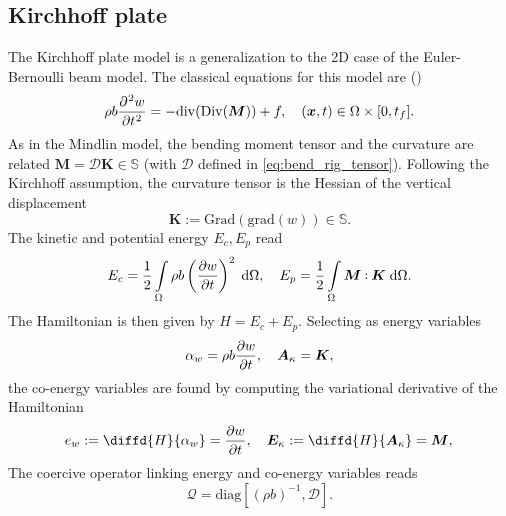\documentclass{ifacconf}
\def\onedot{$\mathsurround0pt\ldotp$}
\def\cddot{%
	\mathbin{\vcenter{\baselineskip.67ex
			\hbox{\onedot}\hbox{\onedot}}%
}}
\begin{document}
\subsection{Kirchhoff plate}
The Kirchhoff plate model is a generalization to the 2D case of the Euler-Bernoulli beam model. The classical equations for this model are (\cite{timoshenko1959theory}) 
\begin{equation}
\label{eq:clKir}
\displaystyle \rho b \diffp[2]{w}{t} = -\mathrm{div}(\mathrm{Div}(\bm{M})) + f, \quad (\bm{x}, t) \in \Omega \times [0, t_f].
\end{equation}
As in the Mindlin model, the bending moment tensor and the curvature are related $\bm{M} = \mathcal{D} \bm{K} \in \mathbb{S}$ (with $\mathcal{D}$ defined in \eqref{eq:bend_rig_tensor}). Following the Kirchhoff assumption, the curvature tensor is the Hessian of the vertical displacement
\begin{equation*}
\bm{K} := \mathrm{Grad}(\mathrm{grad}(w)) \in \mathbb{S}.
\end{equation*}
 The kinetic and potential energy $E_c, E_p$ read
\begin{equation}
E_c =  \frac{1}{2} \int_{\Omega} \rho b \left(\diffp{w}{t} \right)^2 \d\Omega, \quad
E_p = \frac{1}{2} \int_{\Omega} \bm{M} \cddot \bm{K} \d\Omega.
\end{equation} 
The Hamiltonian is then given by $H=E_c + E_p$. Selecting as energy variables
\begin{equation}
\alpha_w = \rho b \diffp{w}{t}, \quad \bm{A}_{\kappa} = \bm{K}, 
\end{equation}
the co-energy variables are found by computing the variational derivative of the Hamiltonian
\begin{equation}
e_w := \diffd{H}{\alpha_w} = \diffp{w}{t}, \quad \bm{E}_{\kappa} := \diffd{H}{\bm{A}_{\kappa}} = \bm{M}, \\
\end{equation}
The coercive operator linking energy and co-energy variables reads
\begin{equation}
\mathcal{Q} = \mathrm{diag}[(\rho b)^{-1}, \mathcal{D}].
\end{equation}
 
\end{document}
